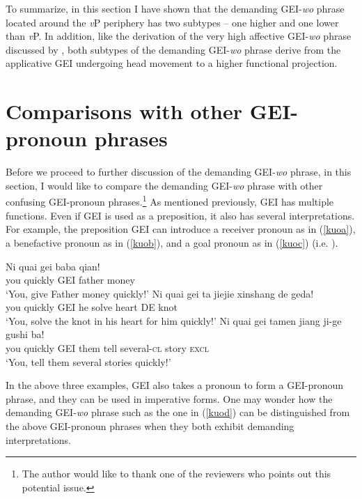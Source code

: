 \documentclass[output=paper,colorlinks,citecolor=brown]{langscibook}
\begin{document}
To summarize, in this section I have shown that the demanding GEI-\textit{wo} phrase located around the \textit{v}P periphery has two subtypes -- one higher and one lower than \textit{v}P. In addition, like the derivation of the very high affective GEI-\textit{wo} phrase discussed by \citet{Tsai2017}, both subtypes of the demanding GEI-\textit{wo} phrase derive from the applicative GEI undergoing head movement to a higher functional projection. 

\section{Comparisons with other GEI-pronoun phrases}\label{sect4}

Before we proceed to further discussion of the demanding GEI-\textit{wo} phrase, in this section, I would like to compare the demanding GEI-\textit{wo} phrase with other confusing GEI-pronoun phrases.\footnote{The author would like to thank one of the reviewers who points out this potential issue.} As mentioned previously, GEI has multiple functions. Even if GEI is used as a preposition, it also has several interpretations. For example, the preposition GEI can introduce a receiver pronoun as in (\ref{kuoa}), a benefactive pronoun as in (\ref{kuob}), and a goal pronoun as in (\ref{kuoc}) (i.e. \citealt{Liu&Pan&Gu}). 

\ea
\label{kuoa}
\gll Ni     quai    gei baba    qian!\\  
     you    quickly GEI father  money\\ 
\glt `You, give Father money quickly!'
\ex
\label{kuob}
\gll Ni     quai    gei ta  jiejie  xinshang    de  geda!\\  
     you    quickly GEI he  solve   heart       DE  knot\\ 
\glt `You, solve the knot in his heart for him quickly!'
\ex
\label{kuoc}
\gll Ni     quai    gei tamen   jiang   ji-ge       gushi   ba!\\  
     you    quickly GEI them      tell    several-\textsc{cl}  story   \textsc{excl}\\ 
\glt `You, tell them several stories quickly!'
\z

In the above three examples, GEI also takes a pronoun to form a GEI-pronoun phrase, and they can be used in imperative forms. One may wonder how the demanding GEI-\textit{wo} phrase such as the one in (\ref{kuod}) can be distinguished from the above GEI-pronoun phrases when they both exhibit demanding interpretations.
\end{document}
